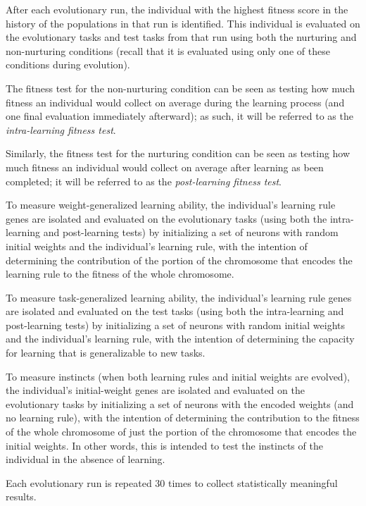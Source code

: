 \documentclass[master]{outhesis}
\begin{document}
After each evolutionary run, the individual with the highest fitness score in the history of the populations in that run is identified.
This individual is evaluated on the evolutionary tasks and test tasks from that run using both the nurturing and non-nurturing conditions (recall that it is evaluated using only one of these conditions during evolution).

The fitness test for the non-nurturing condition can be seen as testing how much fitness an individual would collect on average during the learning process (and one final evaluation immediately afterward);
as such, it will be referred to as the \emph{intra-learning fitness test}.

Similarly, the fitness test for the nurturing condition can be seen as testing how much fitness an individual would collect on average after learning as been completed;
it will be referred to as the \emph{post-learning fitness test}.

To measure weight-generalized learning ability,
the individual's learning rule genes are isolated
and evaluated on the evolutionary tasks (using both the intra-learning and post-learning tests)
by initializing a set of neurons with random initial weights and the individual's learning rule,
with the intention of determining the contribution of the portion of the chromosome that encodes the learning rule to the fitness of the whole chromosome.

To measure task-generalized learning ability,
the individual's learning rule genes are isolated
and evaluated on the test tasks (using both the intra-learning and post-learning tests)
by initializing a set of neurons with random initial weights and the individual's learning rule,
with the intention of determining the capacity for learning that is generalizable to new tasks.

To measure instincts (when both learning rules and initial weights are evolved),
the individual's initial-weight genes are isolated and evaluated on the evolutionary tasks by initializing a set of neurons with the encoded weights (and no learning rule), 
with the intention of determining the contribution to the fitness of the whole chromosome of just the portion of the chromosome that encodes the initial weights.
In other words, this is intended to test the instincts of the individual in the absence of learning.

Each evolutionary run is repeated 30 times to collect statistically meaningful results.

\end{document}
